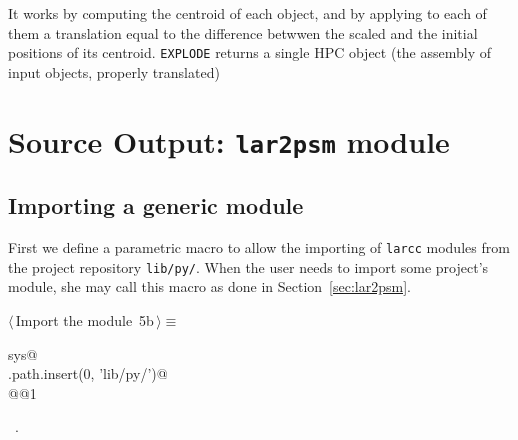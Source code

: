\documentclass[11pt,oneside]{article}	%
\begin{document}
It works by computing the centroid of each object, and by applying to each of them a translation equal to the difference betwwen the scaled and the initial positions of its centroid. 
\texttt{EXPLODE}  returns a single HPC object (the assembly of input objects, properly translated)

\section{Source Output: \texttt{lar2psm} module}


\subsection{Importing a generic module}
First we define a parametric macro to allow the importing of \texttt{larcc} modules from the project repository \texttt{lib/py/}. When the user needs to import some project's module, she may call this macro as done in Section~\ref{sec:lar2psm}.
\begin{flushleft} \small
\begin{minipage}{\linewidth} \label{scrap13}
\protect{}$\langle\,$Import the module\nobreak\ {\footnotesize 5b}$\,\rangle\equiv$
\vspace{-1ex}
\begin{list}{}{} \item
\mbox{}\verb@import sys@\\
\mbox{}\verb@sys.path.insert(0, 'lib/py/')@\\
\mbox{}\verb@import @@1\verb@@\\
\mbox{}\verb@@{\NWsep}
\end{list}
\vspace{-1ex}
\footnotesize\addtolength{\baselineskip}{-1ex}
\begin{list}{}{\setlength{\itemsep}{-\parsep}\setlength{\itemindent}{-\leftmargin}}
\item \NWtxtMacroRefIn\ .
\end{list}
\end{minipage}\\[4ex]
\end{flushleft}
\end{document}

